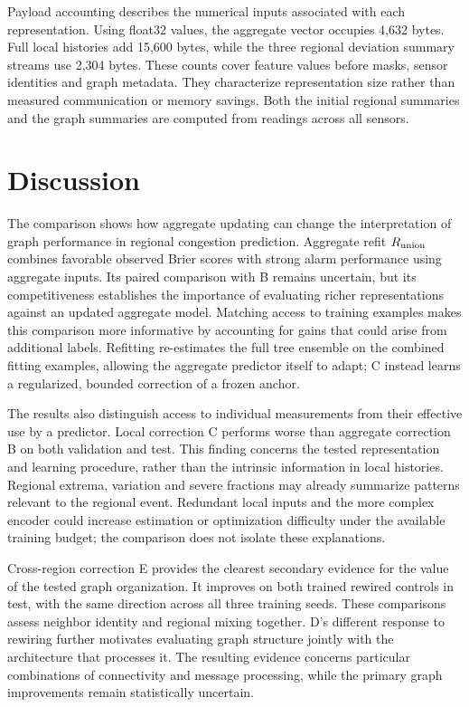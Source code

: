 \documentclass{llncs}
\begin{document}
Payload accounting describes the numerical inputs associated with each representation. Using float32 values, the aggregate vector occupies 4,632 bytes. Full local histories add 15,600 bytes, while the three regional deviation summary streams use 2,304 bytes. These counts cover feature values before masks, sensor identities and graph metadata. They characterize representation size rather than measured communication or memory savings. Both the initial regional summaries and the graph summaries are computed from readings across all sensors.





\section{Discussion}
The comparison shows how aggregate updating can change the interpretation of graph performance in regional congestion prediction. Aggregate refit $R_{\rm union}$ combines favorable observed Brier scores with strong alarm performance using aggregate inputs. Its paired comparison with B remains uncertain, but its competitiveness establishes the importance of evaluating richer representations against an updated aggregate model. Matching access to training examples makes this comparison more informative by accounting for gains that could arise from additional labels. Refitting re-estimates the full tree ensemble on the combined fitting examples, allowing the aggregate predictor itself to adapt; C instead learns a regularized, bounded correction of a frozen anchor.

The results also distinguish access to individual measurements from their effective use by a predictor. Local correction C performs worse than aggregate correction B on both validation and test. This finding concerns the tested representation and learning procedure, rather than the intrinsic information in local histories. Regional extrema, variation and severe fractions may already summarize patterns relevant to the regional event. Redundant local inputs and the more complex encoder could increase estimation or optimization difficulty under the available training budget; the comparison does not isolate these explanations.

Cross-region correction E provides the clearest secondary evidence for the value of the tested graph organization. It improves on both trained rewired controls in test, with the same direction across all three training seeds. These comparisons assess neighbor identity and regional mixing together. D's different response to rewiring further motivates evaluating graph structure jointly with the architecture that processes it. The resulting evidence concerns particular combinations of connectivity and message processing, while the primary graph improvements remain statistically uncertain.
\end{document}
